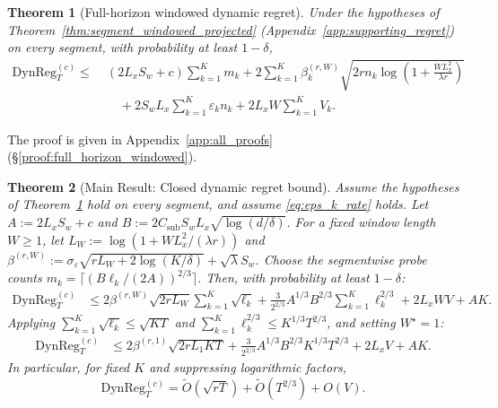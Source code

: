 \documentclass{article}
\newcommand{\DynReg}{\mathrm{DynReg}}
\newtheorem{theorem}{Theorem}
\begin{document}
\begin{theorem}[Full-horizon windowed dynamic regret]
\label{thm:full_horizon_windowed}
Under the hypotheses of Theorem~\ref{thm:segment_windowed_projected} (Appendix~\ref{app:supporting_regret}) on every segment, with probability at least $1-\delta$,
\[
\begin{aligned}
\DynReg_T^{(c)} \le\;&
(2L_xS_w+c)\sum_{k=1}^K m_k
+ 2\sum_{k=1}^K \beta_k^{(r,W)}
\sqrt{2r n_k \log\!\left(1+\frac{W L_x^2}{\lambda r}\right)}
\\
&\quad
+ 2S_wL_x \sum_{k=1}^K \varepsilon_k n_k
+ 2L_xW \sum_{k=1}^K V_k .
\end{aligned}
\]
\end{theorem}

The proof is given in Appendix~\ref{app:all_proofs} (\S\ref{proof:full_horizon_windowed}).

\begin{theorem}[Main Result: Closed dynamic regret bound]
\label{thm:closed_dynamic_regret}
Assume the hypotheses of Theorem~\ref{thm:full_horizon_windowed} hold on every segment, and assume \eqref{eq:eps_k_rate} holds. Let
$A := 2L_x S_w + c$ and $B := 2 C_{\mathrm{sub}} S_w L_x \sqrt{\log(d/\delta)}$.
For a fixed window length $W\ge 1$, let $L_W := \log(1+WL_x^2/(\lambda r))$ and
$\beta^{(r,W)} := \sigma_\varepsilon\sqrt{rL_W + 2\log(K/\delta)} + \sqrt{\lambda}S_w$.
Choose the segmentwise probe counts
$m_k = \lceil (B\ell_k/(2A))^{2/3} \rceil$.
Then, with probability at least $1-\delta$:
\begin{align}
\DynReg_T^{(c)}
&\le
2\beta^{(r,W)} \sqrt{2rL_W} \sum_{k=1}^K \sqrt{\ell_k}
+ \frac{3}{2^{2/3}} A^{1/3} B^{2/3} \sum_{k=1}^K \ell_k^{2/3}
+ 2L_x W V + A K.
\label{eq:closed_bound_segmentwise}
\end{align}
Applying $\sum_{k=1}^K \sqrt{\ell_k} \le \sqrt{KT}$ and $\sum_{k=1}^K \ell_k^{2/3} \le K^{1/3}T^{2/3}$, and setting $W^\star = 1$:
\begin{align}
\DynReg_T^{(c)}
&\le
2\beta^{(r,1)} \sqrt{2rL_1KT}
+ \frac{3}{2^{2/3}} A^{1/3} B^{2/3} K^{1/3} T^{2/3}
+ 2L_x V + A K.
\label{eq:closed_bound_final}
\end{align}
In particular, for fixed $K$ and suppressing logarithmic factors,
\begin{equation}
\DynReg_T^{(c)} = \widetilde O\!\left(\sqrt{rT}\right) + \widetilde O\!\left(T^{2/3}\right) + O(V).
\label{eq:closed_bound_simplified}
\end{equation}
\end{theorem}
\end{document}
